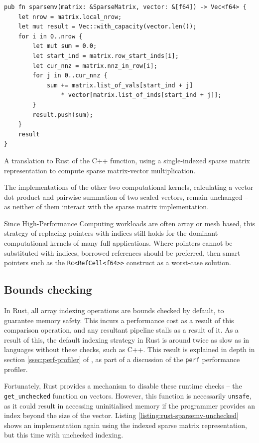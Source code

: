 \begin{listing}[H]
    \begin{verbatim}
pub fn sparsemv(matrix: &SparseMatrix, vector: &[f64]) -> Vec<f64> {
    let nrow = matrix.local_nrow;
    let mut result = Vec::with_capacity(vector.len());
    for i in 0..nrow {
        let mut sum = 0.0;
        let start_ind = matrix.row_start_inds[i];
        let cur_nnz = matrix.nnz_in_row[i];
        for j in 0..cur_nnz {
            sum += matrix.list_of_vals[start_ind + j]
                * vector[matrix.list_of_inds[start_ind + j]];
        }
        result.push(sum);
    }
    result
}
    \end{verbatim}
    \caption{A translation to Rust of the C++ function, using a single-indexed sparse matrix representation to compute sparse matrix-vector multiplication.}
    \label{listing:rust-sparsemv-indexed}
\end{listing}

The implementations of the other two computational kernels, calculating a vector dot product and pairwise summation of two scaled vectors, remain unchanged -- as neither of them interact with the sparse matrix implementation.

Since High-Performance Computing workloads are often array or mesh based, this strategy of replacing pointers with indices still holds for the dominant computational kernels of many full applications. Where pointers cannot be substituted with indices, borrowed references should be preferred, then smart pointers such as the \texttt{Rc<RefCell<f64>>} construct as a worst-case solution.

\subsection{Bounds checking}
\label{sec:translation-bounds-checking}
In Rust, all array indexing operations are bounds checked by default, to guarantee memory safety. This incurs a performance cost as a result of this comparison operation, and any resultant pipeline stalls as a result of it. As a result of this, the default indexing strategy in Rust is around twice as slow as in languages without these checks, such as C++. This result is explained in depth in section \ref{ssec:perf-profiler} of , as part of a discussion of the \texttt{perf} performance profiler.

Fortunately, Rust provides a mechanism to disable these runtime checks -- the \texttt{get\_unchecked} function on vectors. However, this function is necessarily \texttt{unsafe}, as it could result in accessing uninitialised memory if the programmer provides an index beyond the size of the vector. Listing \ref{listing:rust-sparsemv-unchecked} shows an implementation again using the indexed sparse matrix representation, but this time with unchecked indexing.

